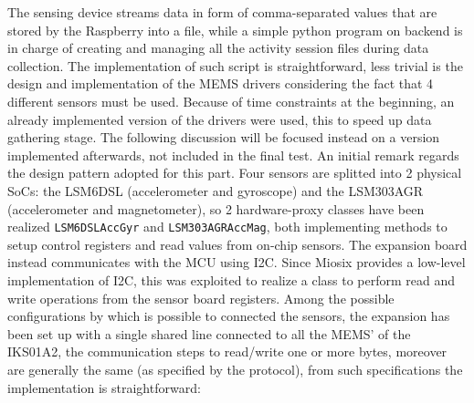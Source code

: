 The sensing device streams data in form of comma-separated values that are stored by the Raspberry into a file, while a simple python program on backend is in charge of creating and managing all the activity session files during data collection.\newline
The implementation of such script is straightforward, less trivial is the design and implementation of the MEMS drivers considering the fact that 4 different sensors must be used. Because of time constraints at the beginning, an already implemented version of the drivers were used, this to speed up data gathering stage. The following discussion will be focused instead on a version implemented afterwards, not included in the final test. \newline
An initial remark regards the design pattern adopted for this part. Four sensors are splitted into 2 physical SoCs: the LSM6DSL (accelerometer and gyroscope) and the LSM303AGR (accelerometer and magnetometer), so 2 hardware-proxy classes have been realized \texttt{LSM6DSLAccGyr} and \texttt{LSM303AGRAccMag}, both implementing methods to setup control registers and read values from on-chip sensors. The expansion board instead communicates with the MCU using I2C. Since Miosix provides a low-level implementation of I2C, this was exploited to realize a class to perform read and write operations from the sensor board registers. Among the possible configurations by which is possible to connected the sensors, the expansion has been set up with a single shared line connected to all the MEMS' of the IKS01A2, the communication steps to read/write one or more bytes, moreover are generally the same (as specified by the protocol), from such specifications the implementation is straightforward:\\

